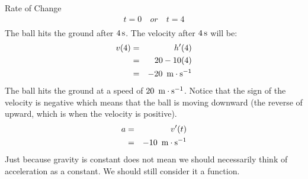 \begin{wex}{Rate of Change}
{\begin{eqnarray*}
t = 0 ~ &or& ~ t = 4\\
\end{eqnarray*}
The ball hits the ground after $4\,\mathrm{s}$.  The velocity after $4\,\mathrm{s}$ will be:
\begin{eqnarray*}
v(4) &=& h'(4)\\
&=& 20 - 10(4)\\
&=& -20~\,\mathrm{m \cdot s^{-1}}\\
\end{eqnarray*}
The ball hits the ground at a speed of $20~\,\mathrm{m \cdot s^{-1}}$. Notice that the sign of the velocity is negative which means that the ball is moving downward (the reverse of upward, which is when the velocity is positive).
\begin{eqnarray*}
a &=& v'(t)\\
&=& -10 ~\,\mathrm{m \cdot s^{-1}}
\end{eqnarray*}
Just because gravity is constant does not mean we should necessarily think of acceleration as a constant. We should still consider it a function.
}
\end{wex}


